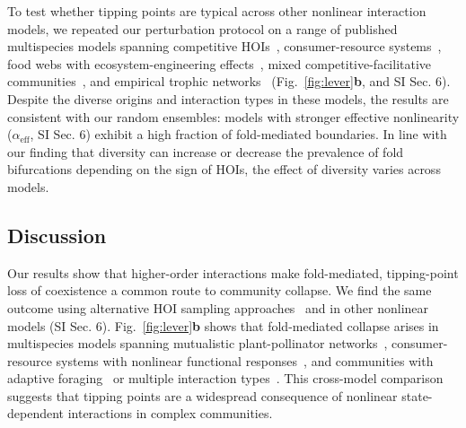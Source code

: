 \documentclass[
 reprint,
 amsmath,
 amssymb,
 aps,
 superscriptaddress,
]{revtex4-2}
\begin{document}
To test whether tipping points are typical across other nonlinear interaction models, we repeated our perturbation protocol on a range of published multispecies models spanning competitive HOIs~\cite{gibbs_when_2024}, consumer-resource systems~\cite{karatayev_potential_2023}, food webs with ecosystem-engineering effects~\cite{mougi_ecosystem_2024}, mixed competitive-facilitative communities~\cite{aguade-gorgorio_taxonomy_2024}, and empirical trophic networks~\cite{stouffer_understanding_2010} (Fig.~\ref{fig:lever}\textbf{b}, and SI Sec. 6). Despite the diverse origins and interaction types in these models, the results are consistent with our random ensembles: models with stronger effective nonlinearity ($\alpha_{\mathrm{eff}}$, SI Sec. 6) exhibit a high fraction of fold-mediated boundaries. In line with our finding that diversity can increase or decrease the prevalence of fold bifurcations depending on the sign of HOIs, the effect of diversity varies across models.

\subsection*{Discussion}

Our results show that higher-order interactions make fold-mediated, tipping-point loss of coexistence a common route to community collapse. We find the same outcome using alternative HOI sampling approaches~\cite{gibbs_when_2024} and in other nonlinear models (SI Sec. 6). Fig.~\ref{fig:lever}\textbf{b} shows that fold-mediated collapse arises in multispecies models spanning mutualistic plant-pollinator networks~\cite{lever_sudden_2014, stouffer_understanding_2010}, consumer-resource systems with nonlinear functional responses~\cite{karatayev_potential_2023}, and communities with adaptive foraging~\cite{mougi_ecosystem_2024} or multiple interaction types~\cite{aguade-gorgorio_taxonomy_2024}. This cross-model comparison suggests that tipping points are a widespread consequence of nonlinear state-dependent interactions in complex communities.
\end{document}

